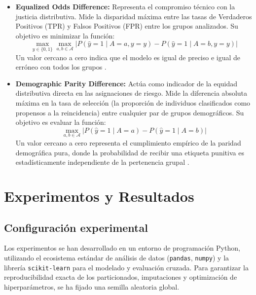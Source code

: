 \documentclass[11pt,a4paper]{article}
\begin{document}
\begin{itemize}
    \item \textbf{Equalized Odds Difference:} Representa el compromiso técnico con la justicia distributiva. Mide la disparidad máxima entre las tasas de Verdaderos Positivos (TPR) y Falsos Positivos (FPR) entre los grupos analizados. Su objetivo es minimizar la función:
    \begin{equation}
        \max_{y \in \{0,1\}} \max_{a,b \in \mathcal{A}} |P(\hat{y}=1 \mid A=a, y=y) - P(\hat{y}=1 \mid A=b, y=y)|
    \end{equation}
    Un valor cercano a cero indica que el modelo es igual de preciso e igual de erróneo con todos los grupos \cite{karimi2021enhancing}.

    \item \textbf{Demographic Parity Difference:} Actúa como indicador de la equidad distributiva directa en las asignaciones de riesgo. Mide la diferencia absoluta máxima en la tasa de selección (la proporción de individuos clasificados como propensos a la reincidencia) entre cualquier par de grupos demográficos. Su objetivo es evaluar la función:
    \begin{equation}
        \max_{a,b \in \mathcal{A}} |P(\hat{y}=1 \mid A=a) - P(\hat{y}=1 \mid A=b)|
    \end{equation}
    Un valor cercano a cero representa el cumplimiento empírico de la paridad demográfica pura, donde la probabilidad de recibir una etiqueta punitiva es estadísticamente independiente de la pertenencia grupal \cite{karimi2021enhancing}.
\end{itemize}

\section{Experimentos y Resultados}
\label{sec:resultados}

\subsection{Configuración experimental}

Los experimentos se han desarrollado en un entorno de programación Python, utilizando el ecosistema estándar de análisis de datos (\texttt{pandas}, \texttt{numpy}) y la librería \texttt{scikit-learn} para el modelado y evaluación cruzada. Para garantizar la reproducibilidad exacta de los particionados, imputaciones y optimización de hiperparámetros, se ha fijado una semilla aleatoria global.
\end{document}
